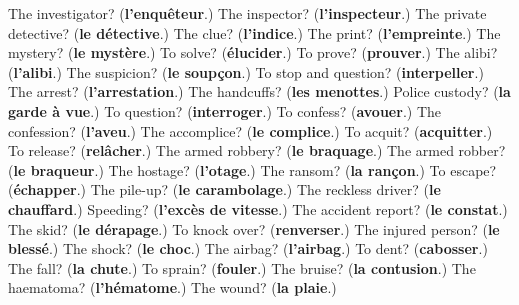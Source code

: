 \begin{tcolorbox}[breakable,colback=teal!4,colframe=teal!35!black,title={Before you move on}]
The investigator? (\textbf{l'enquêteur}.) The inspector? (\textbf{l'inspecteur}.) The private detective? (\textbf{le détective}.) The clue? (\textbf{l'indice}.) The print? (\textbf{l'empreinte}.) The mystery? (\textbf{le mystère}.) To solve? (\textbf{élucider}.) To prove? (\textbf{prouver}.) The alibi? (\textbf{l'alibi}.) The suspicion? (\textbf{le soupçon}.) To stop and question? (\textbf{interpeller}.) The arrest? (\textbf{l'arrestation}.) The handcuffs? (\textbf{les menottes}.) Police custody? (\textbf{la garde à vue}.) To question? (\textbf{interroger}.) To confess? (\textbf{avouer}.) The confession? (\textbf{l'aveu}.) The accomplice? (\textbf{le complice}.) To acquit? (\textbf{acquitter}.) To release? (\textbf{relâcher}.) The armed robbery? (\textbf{le braquage}.) The armed robber? (\textbf{le braqueur}.) The hostage? (\textbf{l'otage}.) The ransom? (\textbf{la rançon}.) To escape? (\textbf{échapper}.) The pile-up? (\textbf{le carambolage}.) The reckless driver? (\textbf{le chauffard}.) Speeding? (\textbf{l'excès de vitesse}.) The accident report? (\textbf{le constat}.) The skid? (\textbf{le dérapage}.) To knock over? (\textbf{renverser}.) The injured person? (\textbf{le blessé}.) The shock? (\textbf{le choc}.) The airbag? (\textbf{l'airbag}.) To dent? (\textbf{cabosser}.) The fall? (\textbf{la chute}.) To sprain? (\textbf{fouler}.) The bruise? (\textbf{la contusion}.) The haematoma? (\textbf{l'hématome}.) The wound? (\textbf{la plaie}.)
\end{tcolorbox}
